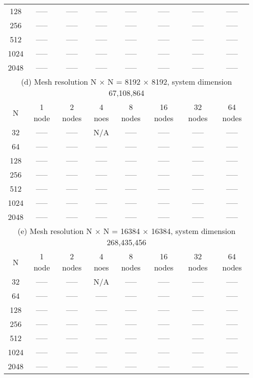\documentclass[11pt]{article}
\begin{document}
\begin{table}[!htbp]
{\begin{tabular}{ |c|c|c|c|c|c|c|c|  }
128  & ----- & ----- & ----- & ----- & ----- & ----- & ----- \\
256  & ----- & ----- & ----- & ----- & ----- & ----- & ----- \\
512  & ----- & ----- & ----- & ----- & ----- & ----- & ----- \\
1024 & ----- & ----- & ----- & ----- & ----- & ----- & ----- \\
2048 & ----- & ----- & ----- & ----- & ----- & ----- & ----- \\
\hline
\hline
\multicolumn{8}{|c|}{(d) Mesh resolution N $\times$ N = 8192 $\times$ 8192, system dimension 67,108,864}\\
\hline
N & 1 node & 2 nodes & 4 noes & 8 nodes & 16 nodes & 32 nodes & 64 nodes \\
\hline
32   & ----- & ----- & N/A   & ----- & ----- & ----- & ----- \\
64   & ----- & ----- & ----- & ----- & ----- & ----- & ----- \\
128  & ----- & ----- & ----- & ----- & ----- & ----- & ----- \\
256  & ----- & ----- & ----- & ----- & ----- & ----- & ----- \\
512  & ----- & ----- & ----- & ----- & ----- & ----- & ----- \\
1024 & ----- & ----- & ----- & ----- & ----- & ----- & ----- \\
2048 & ----- & ----- & ----- & ----- & ----- & ----- & ----- \\
\hline
\hline
\multicolumn{8}{|c|}{(e) Mesh resolution N $\times$ N = 16384 $\times$ 16384, system dimension 268,435,456}\\
\hline
N & 1 node & 2 nodes & 4 noes & 8 nodes & 16 nodes & 32 nodes & 64 nodes \\
\hline
32   & ----- & ----- & N/A   & ----- & ----- & ----- & ----- \\
64   & ----- & ----- & ----- & ----- & ----- & ----- & ----- \\
128  & ----- & ----- & ----- & ----- & ----- & ----- & ----- \\
256  & ----- & ----- & ----- & ----- & ----- & ----- & ----- \\
512  & ----- & ----- & ----- & ----- & ----- & ----- & ----- \\
1024 & ----- & ----- & ----- & ----- & ----- & ----- & ----- \\
2048 & ----- & ----- & ----- & ----- & ----- & ----- & ----- \\
\hline
\end{tabular}
}
\end{table}
\end{document}
